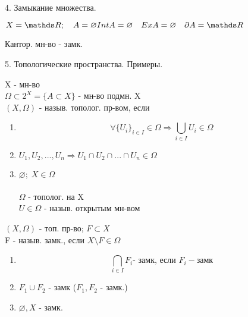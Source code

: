 \documentclass[11pt, fleqn]{article}
\begin{document}
\begin{question}{4. Замыкание множества.}
        \begin{example} 
            $X = \R; \quad A = \varnothing \\
            Int A = \varnothing \quad Ex A = \varnothing \quad \partial A = \R$
        \end{example}

        \begin{example} 
            Кантор. мн-во - замк. \\
        \end{example}
    \end{question}

    \begin{question}{5. Топологические пространства. Примеры.}
        \begin{definition} 
            X - мн-во\\
            $\Omega \subset 2^X = \{A \subset X\}$ - мн-во подмн. X\\
            $(X, \Omega)$ - назыв. тополог. пр-вом, если\\
            \begin{enumerate}
                \item \[\forall \{U_i\}_{i \in I} \in \Omega \Rightarrow\bigcup_{i \in I} U_i \in \Omega\]        
                \item $U_1, U_2, ..., U_n \Rightarrow U_1 \cap U_2 \cap ... \cap U_n \in \Omega$
                \item $\varnothing; \; X \in \Omega$\\\\
                $\Omega$ - тополог. на X\\
                $U \in \Omega$ - назыв. открытым мн-вом
            \end{enumerate}
        \end{definition}

        \begin{definition} 
            $(X, \Omega)$ - топ. пр-во; $F \subset X$ \\
            F - назыв. замк., если $X \setminus F \in \Omega$
        \end{definition}

        \begin{theorem} 
            \begin{enumerate}
                \item \[\bigcap_{i \in I} F_i \text{- замк, если } F_i - \text{замк}\]
                \item $F_1 \cup F_2$ - замк ($F_1, F_2$ - замк.)
                \item $\varnothing, X$ - замк.
            \end{enumerate}
        \end{theorem}


\end{question}
\end{document}

